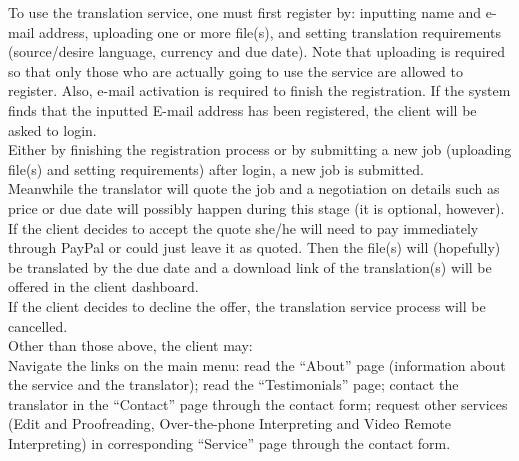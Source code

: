 \documentclass{l3proj}
\begin{document}
To use the translation service, one must first register by: inputting name and
e-mail address, uploading one or more file(s), and setting translation
requirements (source/desire language, currency and due date). Note that
uploading is required so that only those who are actually going to use the
service are allowed to register. Also, e-mail activation is required to finish
the registration. If the system finds that the inputted E-mail address has been
registered, the client will be asked to login.\\

Either by finishing the registration process or by submitting a new job
(uploading file(s) and setting requirements) after login, a new job is
submitted.\\

Meanwhile the translator will quote the job and a negotiation on details such as
price or due date will possibly happen during this stage (it is optional,
however).\\

If the client decides to accept the quote she/he will need to pay immediately
through PayPal or could just leave it as quoted. Then the file(s) will
(hopefully) be translated by the due date and a download link of the
translation(s) will be offered in the client dashboard.\\

If the client decides to decline the offer, the translation service process will
be cancelled.\\

Other than those above, the client may: \\

	Navigate the links on the main menu: read the “About” page (information
about the service and the translator); read the “Testimonials” page; contact the
translator in the “Contact” page through the contact form; request other
services (Edit and Proofreading, Over-the-phone Interpreting and Video Remote
Interpreting) in corresponding “Service” page through the contact form. \\


\newpage
\end{document}
